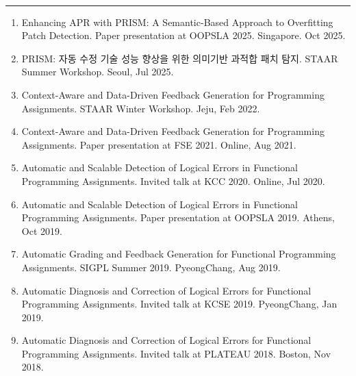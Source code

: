 \documentclass[letterpaper,11pt,oneside]{article}
\begin{document}
\vspace{1.6em}
\\[-0.5em]
\rule{\textwidth}{0.4pt}
\begin{enumerate}
  \item{Enhancing APR with PRISM: A Semantic-Based Approach to Overfitting Patch Detection. Paper presentation at OOPSLA 2025. Singapore. Oct 2025.}

  \item{PRISM: 자동 수정 기술 성능 향상을 위한
의미기반 과적합 패치 탐지. STAAR Summer Workshop. Seoul, Jul 2025.}
	
  \item{Context-Aware and Data-Driven Feedback Generation for Programming Assignments. STAAR Winter Workshop. Jeju, Feb 2022.}

  \item{Context-Aware and Data-Driven Feedback Generation for Programming Assignments. Paper presentation at FSE 2021. Online, Aug 2021.}
		
	\item{Automatic and Scalable Detection of Logical Errors in Functional Programming Assignments. Invited talk at KCC 2020. Online, Jul 2020.} 
  
	\item{Automatic and Scalable Detection of Logical Errors in Functional Programming Assignments. Paper presentation at OOPSLA 2019. Athens, Oct 2019.} 
	
  \item{Automatic Grading and Feedback Generation for Functional Programming Assignments. SIGPL Summer 2019. PyeongChang, Aug 2019.}
	
  \item{Automatic Diagnosis and Correction of Logical Errors for Functional Programming Assignments. Invited talk at KCSE 2019. PyeongChang, Jan 2019.}
  
	\item{Automatic Diagnosis and Correction of Logical Errors for Functional Programming Assignments. Invited talk at PLATEAU 2018. Boston, Nov 2018.}
	
\end{enumerate}
\end{document}
